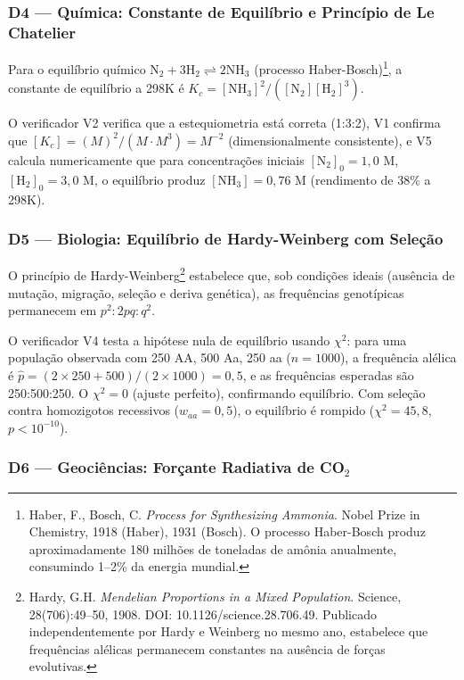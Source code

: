 \subsubsection{D4 — Química: Constante de Equilíbrio e Princípio de Le Chatelier}

Para o equilíbrio químico $\mathrm{N_2 + 3H_2 \rightleftharpoons 2NH_3}$
(processo Haber-Bosch)\footnote{Haber, F., Bosch, C. \textit{Process for
Synthesizing Ammonia}. Nobel Prize in Chemistry, 1918 (Haber), 1931 (Bosch).
O processo Haber-Bosch produz aproximadamente 180 milhões de toneladas de
amônia anualmente, consumindo 1--2\% da energia mundial.}, a constante de
equilíbrio a 298K é $K_c = [\mathrm{NH_3}]^2 / ([\mathrm{N_2}][\mathrm{H_2}]^3)$.

O verificador V2 verifica que a estequiometria está correta (1:3:2), V1
confirma que $[K_c] = (M)^2 / (M\cdot M^3) = M^{-2}$ (dimensionalmente
consistente), e V5 calcula numericamente que para concentrações iniciais
$[\mathrm{N_2}]_0 = 1,0$ M, $[\mathrm{H_2}]_0 = 3,0$ M, o equilíbrio produz
$[\mathrm{NH_3}] = 0,76$ M (rendimento de 38\% a 298K).

\subsubsection{D5 — Biologia: Equilíbrio de Hardy-Weinberg com Seleção}

O princípio de Hardy-Weinberg\footnote{Hardy, G.H. \textit{Mendelian Proportions
in a Mixed Population}. Science, 28(706):49--50, 1908. DOI:
10.1126/science.28.706.49. Publicado independentemente por Hardy e Weinberg
no mesmo ano, estabelece que frequências alélicas permanecem constantes na
ausência de forças evolutivas.} estabelece que, sob condições ideais (ausência
de mutação, migração, seleção e deriva genética), as frequências genotípicas
permanecem em $p^2 : 2pq : q^2$.

O verificador V4 testa a hipótese nula de equilíbrio usando $\chi^2$: para
uma população observada com 250 AA, 500 Aa, 250 aa ($n=1000$), a frequência
alélica é $\hat{p} = (2\times250 + 500)/(2\times1000) = 0,5$, e as frequências
esperadas são 250:500:250. O $\chi^2 = 0$ (ajuste perfeito), confirmando
equilíbrio. Com seleção contra homozigotos recessivos ($w_{aa} = 0,5$), o
equilíbrio é rompido ($\chi^2 = 45,8$, $p < 10^{-10}$).

\subsubsection{D6 — Geociências: Forçante Radiativa de CO$_2$}


